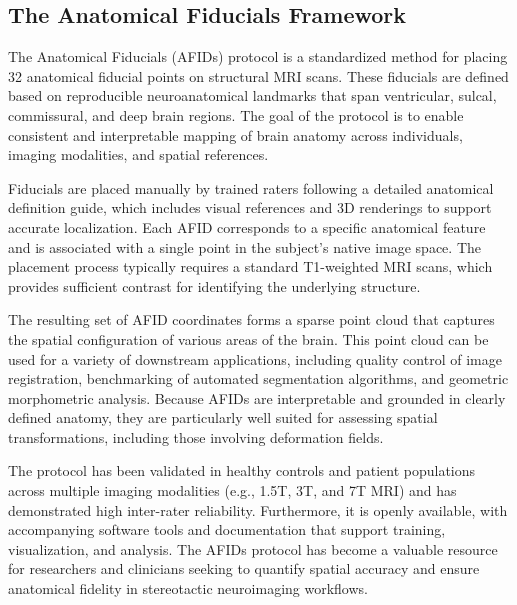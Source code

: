 \subsection{The Anatomical Fiducials Framework}
The Anatomical Fiducials (AFIDs) protocol is a standardized method for placing 32 anatomical fiducial points on structural MRI scans. These fiducials are defined based on reproducible neuroanatomical landmarks that span ventricular, sulcal, commissural, and deep brain regions. The goal of the protocol is to enable consistent and interpretable mapping of brain anatomy across individuals, imaging modalities, and spatial references.

Fiducials are placed manually by trained raters following a detailed anatomical definition guide, which includes visual references and 3D renderings to support accurate localization. Each AFID corresponds to a specific anatomical feature and is associated with a single point in the subject's native image space. The placement process typically requires a standard T1-weighted MRI scans, which provides sufficient contrast for identifying the underlying structure.

The resulting set of AFID coordinates forms a sparse point cloud that captures the spatial configuration of various areas of the brain. This point cloud can be used for a variety of downstream applications, including quality control of image registration, benchmarking of automated segmentation algorithms, and geometric morphometric analysis. Because AFIDs are interpretable and grounded in clearly defined anatomy, they are particularly well suited for assessing spatial transformations, including those involving deformation fields.

The protocol has been validated in healthy controls and patient populations across multiple imaging modalities (e.g., 1.5T, 3T, and 7T MRI) and has demonstrated high inter-rater reliability. Furthermore, it is openly available, with accompanying software tools and documentation that support training, visualization, and analysis. The AFIDs protocol has become a valuable resource for researchers and clinicians seeking to quantify spatial accuracy and ensure anatomical fidelity in stereotactic neuroimaging workflows.

